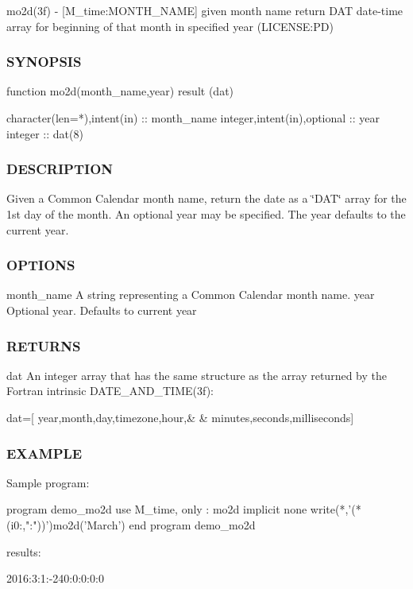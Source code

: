 mo2d(3f) -\/ \mbox{[}M\+\_\+time\+:M\+O\+N\+T\+H\+\_\+\+N\+A\+ME\mbox{]} given month name return D\+AT date-\/time array for beginning of that month in specified year (L\+I\+C\+E\+N\+SE\+:PD) 

\subsubsection*{S\+Y\+N\+O\+P\+S\+IS}

\begin{DoxyVerb}   function mo2d(month_name,year) result (dat)

    character(len=*),intent(in) :: month_name
    integer,intent(in),optional :: year
    integer                     :: dat(8)
\end{DoxyVerb}


\subsubsection*{D\+E\+S\+C\+R\+I\+P\+T\+I\+ON}

Given a Common Calendar month name, return the date as a \char`\"{}\+D\+A\+T\char`\"{} array for the 1st day of the month. An optional year may be specified. The year defaults to the current year.

\subsubsection*{O\+P\+T\+I\+O\+NS}

month\+\_\+name A string representing a Common Calendar month name. year Optional year. Defaults to current year \subsubsection*{R\+E\+T\+U\+R\+NS}

dat An integer array that has the same structure as the array returned by the Fortran intrinsic D\+A\+T\+E\+\_\+\+A\+N\+D\+\_\+\+T\+I\+M\+E(3f)\+:

dat=\mbox{[} year,month,day,timezone,hour,\& \& minutes,seconds,milliseconds\mbox{]}

\subsubsection*{E\+X\+A\+M\+P\+LE}

\begin{DoxyVerb}Sample program:

 program demo_mo2d
 use M_time, only : mo2d
 implicit none
    write(*,'(*(i0:,":"))')mo2d('March')
 end program demo_mo2d

results:

   2016:3:1:-240:0:0:0:0
\end{DoxyVerb}


